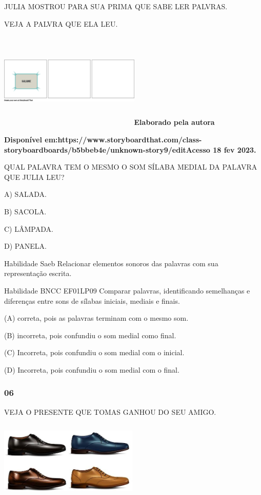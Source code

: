 \begin{escola}
JULIA MOSTROU PARA SUA PRIMA QUE SABE LER PALVRAS.

VEJA A PALVRA QUE ELA LEU.

\includegraphics[width=2.64104in,height=1.80504in]{media/image190.png}\textbf{Elaborado
pela autora}

\textbf{Disponível
em:https://www.storyboardthat.com/class-storyboardboards/b5bbeb4e/unknown-story9/editAcesso
18 fev 2023.}

QUAL PALAVRA TEM O MESMO O SOM SÍLABA MEDIAL DA PALAVRA QUE JULIA LEU?

A) SALADA.

B) SACOLA.

C) LÂMPADA.

D) PANELA.

Habilidade Saeb Relacionar elementos sonoros das palavras com sua
representação escrita.

Habilidade BNCC EF01LP09 Comparar palavras, identificando semelhanças e
diferenças entre sons de sílabas iniciais, mediais e finais.

(A) correta, pois as palavras terminam com o mesmo som.

(B) incorreta, pois confundiu o som medial como final.

(C) Incorreta, pois confundiu o som medial com o inicial.

(D) Incorreta, pois confundiu o som medial com o final.

\subsubsection{06}\label{section-31}

VEJA O PRESENTE QUE TOMAS GANHOU DO SEU AMIGO.

\includegraphics[width=2.60694in,height=1.48889in]{media/image191.jpg}


\end{escola}
